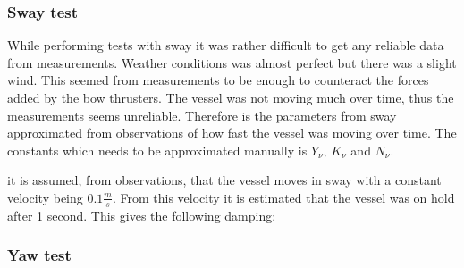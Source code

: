 \subsubsection{Sway test}
While performing tests with sway it was rather difficult to get any reliable data from measurements. Weather conditions was almost perfect but there was a slight wind. This seemed from measurements to be enough to counteract the forces added by the bow thrusters. The vessel was not moving much over time, thus the measurements seems unreliable. Therefore is the parameters from sway approximated from observations of how fast the vessel was moving over time. The constants which needs to be approximated manually is $Y_\nu$, $K_\nu$ and $N_\nu$.

it is assumed, from observations, that the vessel moves in sway with a constant velocity being $0.1\frac{m}{s}$. From this velocity it is estimated that the vessel was on hold after 1 second. This gives the following damping:
\subsubsection{Yaw test}

\newpage
